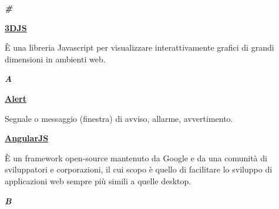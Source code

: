 
\cleardoublepage
{}
{}
\noindent\hrulefill\hspace{4mm}\textbf{\textsl{\Huge{\#}}}\hspace{4mm}\hrulefill

\vspace*{2\bigskipamount}

\begin{addmargin}[0em]{0em}	
	\textbf{\underline{3DJS}} 
\end{addmargin}
	
\medskip
\begin{addmargin}[5em]{1em}	
È una libreria Javascript per visualizzare interattivamente grafici di grandi dimensioni in ambienti web.
\end{addmargin}

\newpage

\cleardoublepage
{}
{}
\noindent\hrulefill\hspace{4mm}\textbf{\textsl{\Huge{A}}}\hspace{4mm}\hrulefill

\vspace*{2\bigskipamount}

\begin{addmargin}[0em]{0em}
	\textbf{\underline{Alert}} 
\end{addmargin}
	
\medskip
\begin{addmargin}[5em]{1em}
Segnale o messaggio (finestra) di avviso, allarme, avvertimento.
\end{addmargin}

\bigskip
\begin{addmargin}[0em]{0em}
	\textbf{\underline{AngularJS}} 
\end{addmargin}
	
\medskip
\begin{addmargin}[5em]{1em}
È un framework open-source mantenuto da Google e da una comunità di sviluppatori e corporazioni, il cui scopo è quello di facilitare lo sviluppo di applicazioni web sempre più simili a quelle desktop.
\end{addmargin}

\newpage

\cleardoublepage
{}
{}
\noindent\hrulefill\hspace{4mm}\textbf{\textsl{\Huge{B}}}\hspace{4mm}\hrulefill

